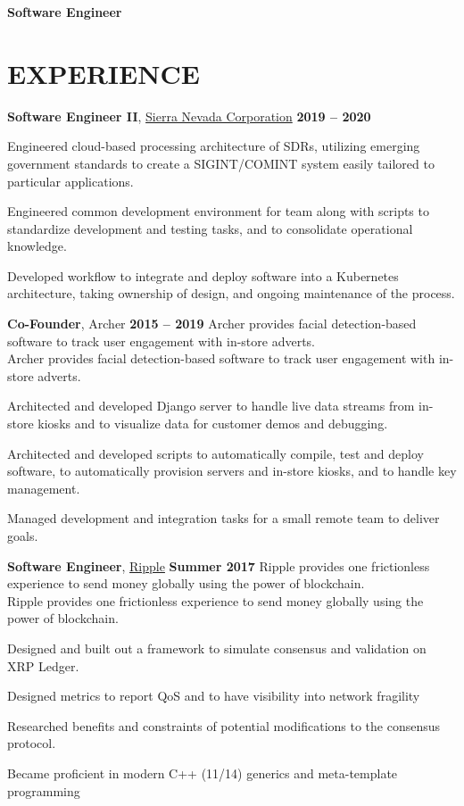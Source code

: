 \documentclass[centered]{res} %
\newcommand{\bullets}[1]{
	\begin{itemize}[noitemsep]
		{#1}
	\end{itemize}
	\vspace{-6pt}
}
\newcommand{\experience}[5]{
	\textbf{#1}, {#2} \hfill \textbf{#3}
	\ifx\hfbuzz#4\hfbuzz
	\else
		\\ {#4}
	\fi
	\bullets{#5}
}
\begin{document}
\newcommand{\email}{\href{mailto:jmmcgee.00@gmail.com}{jmmcgee.00@gmail.com} }
\newcommand{\phone}{\href{tel:+1-213-646-1070}{(213) 646-1070} }
\address{\email | \phone}

\begin{resume}
\centerline{\textbf{\huge Software Engineer}}
\parbox{\textwidth}{}

\section{EXPERIENCE}
	\experience {Software Engineer II}{\href{https://www.sncorp.com}{Sierra Nevada Corporation}}{2019 -- 2020}
	{}{
		\item Engineered cloud-based processing architecture of SDRs, utilizing emerging government standards to create a SIGINT/COMINT system easily tailored to particular applications.
		\item Engineered common development environment for team along with scripts to standardize development and testing tasks, and to consolidate operational knowledge.
		\item Developed workflow to integrate and deploy software into a Kubernetes architecture, taking ownership of design, and ongoing maintenance of the process.
	}

	\experience{Co-Founder}{Archer}{2015 -- 2019}
	{Archer provides facial detection-based software to track user engagement with in-store adverts.}{
		\item Architected and developed Django server to handle live data streams from in-store kiosks and to visualize data for customer demos and debugging.
		\item Architected and developed scripts to automatically compile, test and deploy software, to automatically provision servers and in-store kiosks, and to handle key management.
		\item Managed development and integration tasks for a small remote team to deliver goals.
	}

	\experience{Software Engineer}{\href{https://ripple.com/}{Ripple}}{Summer 2017}
	{Ripple provides one frictionless experience to send money globally using the power of blockchain.}{
		\item Designed and built out a framework to simulate consensus and validation on XRP Ledger.
		\item Designed metrics to report QoS and  to have visibility into network fragility
		\item Researched benefits and constraints of potential modifications to the consensus protocol.
		\item Became proficient in modern C++ (11/14) generics and meta-template programming
	}


\end{resume}
\end{document}
